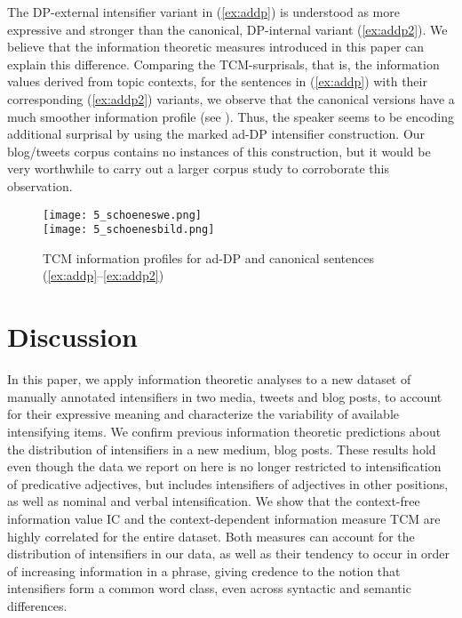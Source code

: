 \documentclass[output=paper,colorlinks,citecolor=brown]{langscibook}
\begin{document}
The DP-external  intensifier variant in (\ref{ex:addp}) is understood as more expressive and stronger than the canonical, DP-internal variant (\ref{ex:addp2}). We believe that the information theoretic measures introduced in this paper can explain this difference. Comparing the TCM-surprisals, that is, the information values derived from topic contexts, for the sentences in (\ref{ex:addp}) with their corresponding (\ref{ex:addp2}) variants, we observe that the canonical versions have a much smoother information profile (see ). Thus, the speaker seems to be encoding additional surprisal by using the marked ad-DP intensifier construction. Our blog/tweets corpus contains no instances of this construction, but it would be very worthwhile to carry out a larger corpus study to corroborate this observation.

\begin{figure}
    \centering
    \texttt{[image: 5\_schoeneswe.png]}\\
    \texttt{[image: 5\_schoenesbild.png]}
    \caption{TCM information profiles for ad-DP and canonical sentences (\ref{ex:addp}--\ref{ex:addp2})}
    \label{fig:addp}
\end{figure}


\section{Discussion}\label{sec:5_discussion}\largerpage

In this paper, we apply information theoretic analyses to a new dataset of manually annotated intensifiers in two media, tweets and blog posts, to account for their expressive meaning and characterize the variability of available intensifying items. We confirm previous information theoretic predictions about the distribution of intensifiers in a new medium, blog posts. These results hold even though the data we report on here is no longer restricted to  intensification of predicative adjectives, but includes intensifiers of adjectives in other positions, as well as nominal and verbal intensification. We show that  the context-free information value IC and the context-dependent information measure TCM  are highly correlated for the entire dataset. Both measures can account for the distribution of intensifiers in our data, as well as their tendency to occur in order of increasing information in a phrase, giving credence to the notion that intensifiers form a common word class, even across syntactic and semantic differences. 
\end{document}
